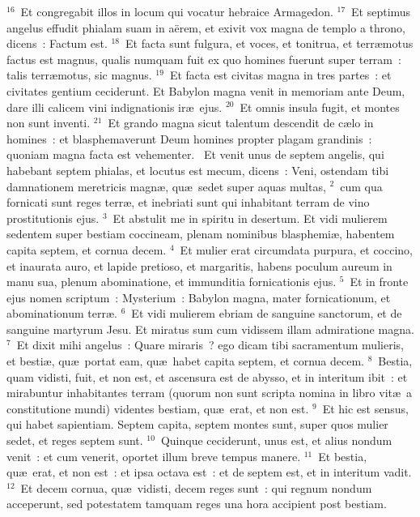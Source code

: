 ${}^{16}$~Et congregabit illos in locum qui vocatur hebraice Armagedon.
${}^{17}$~Et septimus angelus effudit phialam suam in a\"erem, et exivit vox magna de templo a throno, dicens~: Factum est.
${}^{18}$~Et facta sunt fulgura, et voces, et tonitrua, et terr\ae motus factus est magnus, qualis numquam fuit ex quo homines fuerunt super terram~: talis terr\ae motus, sic magnus.
${}^{19}$~Et facta est civitas magna in tres partes~: et civitates gentium ceciderunt. Et Babylon magna venit in memoriam ante Deum, dare illi calicem vini indignationis ir\ae\ ejus.
${}^{20}$~Et omnis insula fugit, et montes non sunt inventi.
${}^{21}$~Et grando magna sicut talentum descendit de c\ae lo in homines~: et blasphemaverunt Deum homines propter plagam grandinis~: quoniam magna facta est vehementer.
~Et venit unus de septem angelis, qui habebant septem phialas, et locutus est mecum, dicens~: Veni, ostendam tibi damnationem meretricis magn\ae , qu\ae\ sedet super aquas multas,
${}^{2}$~cum qua fornicati sunt reges terr\ae , et inebriati sunt qui inhabitant terram de vino prostitutionis ejus.
${}^{3}$~Et abstulit me in spiritu in desertum. Et vidi mulierem sedentem super bestiam coccineam, plenam nominibus blasphemi\ae , habentem capita septem, et cornua decem.
${}^{4}$~Et mulier erat circumdata purpura, et coccino, et inaurata auro, et lapide pretioso, et margaritis, habens poculum aureum in manu sua, plenum abominatione, et immunditia fornicationis ejus.
${}^{5}$~Et in fronte ejus nomen scriptum~: Mysterium~: Babylon magna, mater fornicationum, et abominationum terr\ae .
${}^{6}$~Et vidi mulierem ebriam de sanguine sanctorum, et de sanguine martyrum Jesu. Et miratus sum cum vidissem illam admiratione magna.
${}^{7}$~Et dixit mihi angelus~: Quare miraris~? ego dicam tibi sacramentum mulieris, et besti\ae , qu\ae\ portat eam, qu\ae\ habet capita septem, et cornua decem.
${}^{8}$~Bestia, quam vidisti, fuit, et non est, et ascensura est de abysso, et in interitum ibit~: et mirabuntur inhabitantes terram (quorum non sunt scripta nomina in libro vit\ae\ a constitutione mundi) videntes bestiam, qu\ae\ erat, et non est.
${}^{9}$~Et hic est sensus, qui habet sapientiam. Septem capita, septem montes sunt, super quos mulier sedet, et reges septem sunt.
${}^{10}$~Quinque ceciderunt, unus est, et alius nondum venit~: et cum venerit, oportet illum breve tempus manere.
${}^{11}$~Et bestia, qu\ae\ erat, et non est~: et ipsa octava est~: et de septem est, et in interitum vadit.
${}^{12}$~Et decem cornua, qu\ae\ vidisti, decem reges sunt~: qui regnum nondum acceperunt, sed potestatem tamquam reges una hora accipient post bestiam.
